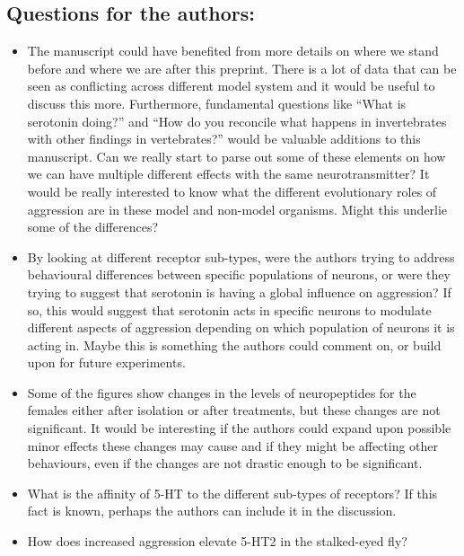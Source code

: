 \documentclass[10pt]{article}
\providecommand{\tightlist}{\setlength{\itemsep}{0pt}\setlength{\parskip}{0pt}}%
\begin{document}
\par\null

\subsection*{Questions for the authors:}

{\label{996460}}

\begin{itemize}
\tightlist
\item
  The manuscript could have benefited from more details on where we
  stand before and where we are after this preprint. There is a lot of
  data that can be seen as conflicting across different model system and
  it would be useful to discuss this more. Furthermore, fundamental
  questions like ``What is serotonin doing?'' and ``How do you reconcile
  what happens in invertebrates with other findings in vertebrates?''
  would be valuable additions to this manuscript. Can we really start to
  parse out some of these elements on how we can have multiple different
  effects with the same neurotransmitter? It would be really interested
  to know what the different evolutionary roles of aggression are in
  these model and non-model organisms. Might this underlie some of the
  differences?
\item
  By looking at different receptor sub-types, were the authors trying to
  address behavioural differences between specific populations of
  neurons, or were they trying to suggest that serotonin is having a
  global influence on aggression? If so, this would suggest that
  serotonin acts in specific neurons to modulate different aspects of
  aggression depending on which population of neurons it is acting in.
  Maybe this is something the authors could comment on, or build upon
  for future experiments.
\item
  Some of the figures show changes in the levels of neuropeptides for
  the females either after isolation or after treatments, but these
  changes are not significant. It would be interesting if the authors
  could expand upon possible minor effects these changes may cause and
  if they might be affecting other behaviours, even if the changes are
  not drastic enough to be significant.
\item
  What is the affinity of 5-HT to the different sub-types of receptors?
  If this fact is known, perhaps the authors can include it in the
  discussion.
\item
  How does increased aggression elevate 5-HT2 in the stalked-eyed fly?

\end{itemize}
\end{document}
